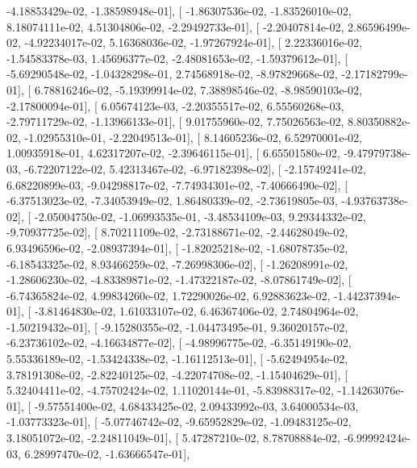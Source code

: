 \documentclass{article}
\begin{document}
         -4.18853429e-02,  -1.38598948e-01],
       [ -1.86307536e-02,  -1.83526010e-02,   8.18074111e-02,
          4.51304806e-02,  -2.29492733e-01],
       [ -2.20407814e-02,   2.86596499e-02,  -4.92234017e-02,
          5.16368036e-02,  -1.97267924e-01],
       [  2.22336016e-02,  -1.54583378e-03,   1.45696377e-02,
         -2.48081653e-02,  -1.59379612e-01],
       [ -5.69290548e-02,  -1.04328298e-01,   2.74568918e-02,
         -8.97829668e-02,  -2.17182799e-01],
       [  6.78816246e-02,  -5.19399914e-02,   7.38898546e-02,
         -8.98590103e-02,  -2.17800094e-01],
       [  6.05674123e-03,  -2.20355517e-02,   6.55560268e-03,
         -2.79711729e-02,  -1.13966133e-01],
       [  9.01755960e-02,   7.75026563e-02,   8.80350882e-02,
         -1.02955310e-01,  -2.22049513e-01],
       [  8.14605236e-02,   6.52970001e-02,   1.00935918e-01,
          4.62317207e-02,  -2.39646115e-01],
       [  6.65501580e-02,  -9.47979738e-03,  -6.72207122e-02,
          5.42313467e-02,  -6.97182398e-02],
       [ -2.15749241e-02,   6.68220899e-03,  -9.04298817e-02,
         -7.74934301e-02,  -7.40666490e-02],
       [ -6.37513023e-02,  -7.34053949e-02,   1.86480339e-02,
         -2.73619805e-03,  -4.93763738e-02],
       [ -2.05004750e-02,  -1.06993535e-01,  -3.48534109e-03,
          9.29344332e-02,  -9.70937725e-02],
       [  8.70211109e-02,  -2.73188671e-02,  -2.44628049e-02,
          6.93496596e-02,  -2.08937394e-01],
       [ -1.82025218e-02,  -1.68078735e-02,  -6.18543325e-02,
          8.93466259e-02,  -7.26998306e-02],
       [ -1.26208991e-02,  -1.28606230e-02,  -4.83389871e-02,
         -1.47322187e-02,  -8.07861749e-02],
       [ -6.74365824e-02,   4.99834260e-02,   1.72290026e-02,
          6.92883623e-02,  -1.44237394e-01],
       [ -3.81464830e-02,   1.61033107e-02,   6.46367406e-02,
          2.74804964e-02,  -1.50219432e-01],
       [ -9.15280355e-02,  -1.04473495e-01,   9.36020157e-02,
         -6.23736102e-02,  -4.16634877e-02],
       [ -4.98996775e-02,  -6.35149190e-02,   5.55336189e-02,
         -1.53424338e-02,  -1.16112513e-01],
       [ -5.62494954e-02,   3.78191308e-02,  -2.82240125e-02,
         -4.22074708e-02,  -1.15404629e-01],
       [  5.32404411e-02,  -4.75702424e-02,   1.11020144e-01,
         -5.83988317e-02,  -1.14263076e-01],
       [ -9.57551400e-02,   4.68433425e-02,   2.09433992e-03,
          3.64000534e-03,  -1.03773323e-01],
       [ -5.07746742e-02,  -9.65952829e-02,  -1.09483125e-02,
          3.18051072e-02,  -2.24811049e-01],
       [  5.47287210e-02,   8.78708884e-02,  -6.99992424e-03,
          6.28997470e-02,  -1.63666547e-01],
\end{document}
